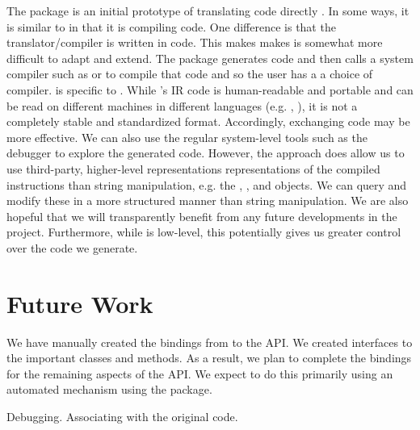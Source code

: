 The  package is an initial prototype of translating \R{}
code directly \C. In some ways, it is similar to  in that
it is compiling \R{} code. One difference is that the
translator/compiler is written in \C{} code.  This makes makes is
somewhat more difficult to adapt and extend.  The package generates
\C{} code and then calls a system compiler such as \gcc{} or \clang{}
to compile that code and so the user has a a choice of compiler.
\Rllvm{} is specific to \llvm{}.  While \llvm's IR code is
human-readable and portable and can be read on different machines in
different languages (e.g. \R, \Python), it is not a completely stable
and standardized format. Accordingly, exchanging \C{} code may be more
effective.  We can also use the regular system-level tools such as the
debugger to explore the generated code.  However, the \Rllvm{}
approach does allow us to use third-party, higher-level
representations representations of the compiled instructions than
string manipulation, e.g. the , ,
 and  objects.  We can query
and modify these in a more structured manner than string manipulation.
We are also hopeful that we will transparently benefit from any future
developments in the \llvm{} project.  Furthermore, while \llvm{} is
low-level, this potentially gives us greater control over the code we
generate.



\section{Future Work}

We have manually created the bindings from \R{} to the \llvm{} API. We
created interfaces to the important classes and methods. As a result,
we plan to complete the bindings for the remaining aspects of the API.
We expect to do this primarily using an automated mechanism using the
\RClang{} package.

Debugging.
Associating with the original code.
